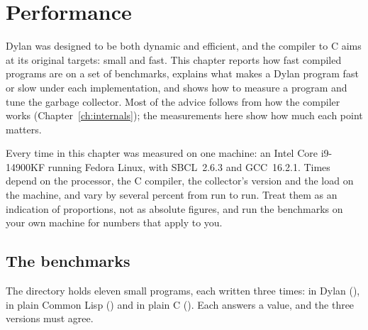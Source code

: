 \chapter{Performance}\label{ch:performance}
\sloppy

Dylan was designed to be both dynamic and efficient, and the compiler to
C aims at its original targets: small and fast. This chapter reports how
fast compiled programs are on a set of benchmarks, explains what makes a
Dylan program fast or slow under each implementation, and shows how to
measure a program and tune the garbage collector. Most of the advice
follows from how the compiler works (Chapter~\ref{ch:internals}); the
measurements here show how much each point matters.

\begin{notebox}
Every time in this chapter was measured on one machine: an Intel Core
i9-14900KF running Fedora Linux, with SBCL~2.6.3 and GCC~16.2.1. Times
depend on the processor, the C compiler, the collector's version and the
load on the machine, and vary by several percent from run to run.
Treat them as an indication of proportions, not as absolute figures, and
run the benchmarks on your own machine for numbers that apply to you.
\end{notebox}

\section{The benchmarks}\label{sec:perf-benchmarks}

The directory  holds eleven small programs, each written
three times: in Dylan (), in plain Common Lisp
() and in plain C (). Each answers
a value, and the three versions must agree.

